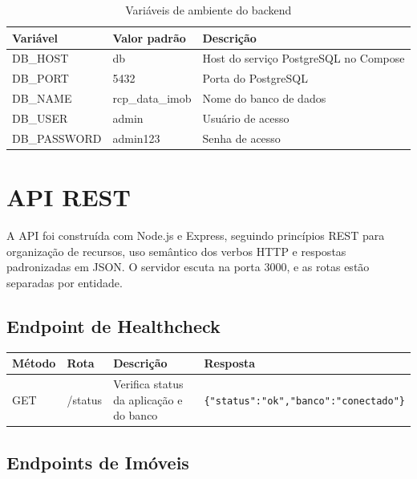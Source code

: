 \documentclass[12pt, a4paper]{article}
\newcommand{\thead}[1]{\cellcolor{tableheader}\color{white}\bfseries #1}
\newcommand{\talt}{\rowcolor{tablerowalt}}
\begin{document}
\begin{table}[H]
\centering
\begin{tabularx}{\textwidth}{|l|l|X|}
\hline
\thead{Variável} & \thead{Valor padrão} & \thead{Descrição} \\
\hline
DB\_HOST     & db            & Host do serviço PostgreSQL no Compose \\
\talt DB\_PORT     & 5432          & Porta do PostgreSQL \\
DB\_NAME     & rcp\_data\_imob & Nome do banco de dados \\
\talt DB\_USER     & admin         & Usuário de acesso \\
DB\_PASSWORD & admin123      & Senha de acesso \\
\hline
\end{tabularx}
\caption{Variáveis de ambiente do backend}
\end{table}

\section{API REST}

A API foi construída com Node.js e Express, seguindo princípios REST para organização de recursos, uso semântico dos verbos HTTP e respostas padronizadas em JSON. O servidor escuta na porta 3000, e as rotas estão separadas por entidade.

\subsection{Endpoint de Healthcheck}

\begin{table}[H]
\centering
\begin{tabularx}{\textwidth}{|l|l|l|X|}
\hline
\thead{Método} & \thead{Rota} & \thead{Descrição} & \thead{Resposta} \\
\hline
GET & /status & Verifica status da aplicação e do banco & \texttt{\{"status":"ok","banco":"conectado"\}} \\
\hline
\end{tabularx}
\end{table}

\subsection{Endpoints de Imóveis}
\end{document}
